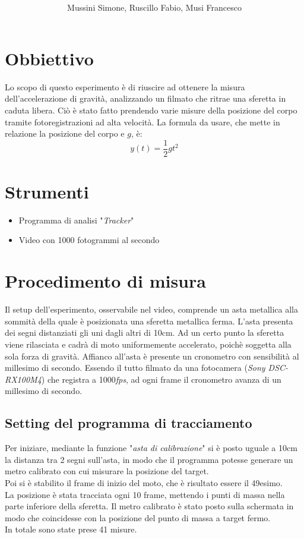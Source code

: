 \documentclass[12pt, a4paper]{article}
\title{\textbf{\scalebox{1.3}{\text{Caduta libera}}}}
\date{}
\author{\begin{small}Mussini Simone, Ruscillo Fabio, Musi Francesco\end{small}}
\begin{document}
\maketitle
\section{Obbiettivo}
\label{sezione obbiettivi}
Lo scopo di questo esperimento è di riuscire ad ottenere la misura dell'accelerazione di gravità, analizzando un filmato che ritrae una sferetta in caduta libera. 
Ciò è stato fatto prendendo varie misure della posizione del corpo tramite fotoregistrazioni ad alta velocità. 
La formula da usare, che mette in relazione la posizione del corpo e $g$, è:
\begin{equation*}
    y(t) = \frac{1}{2}gt^2
\end{equation*}


\section{Strumenti}
\begin{itemize}
\setlength\itemsep{0mm}
    \item Programma di analisi "\textit{Tracker}"
    \item Video con 1000 fotogrammi al secondo
\end{itemize}

\section{Procedimento di misura}
Il setup dell'esperimento, osservabile nel video, comprende un asta metallica alla sommità della quale è posizionata una sferetta metallica ferma. L'asta presenta dei segni distanziati gli uni dagli altri di 10cm. 
Ad un certo punto la sferetta viene rilasciata e cadrà di moto uniformemente accelerato, poichè soggetta alla sola forza di gravità. Affianco all'asta è presente un cronometro con sensibilità al millesimo di secondo. 
Essendo il tutto filmato da una fotocamera (\textit{Sony DSC-RX100M4}) che registra a 1000\textit{fps}, ad ogni frame il cronometro avanza di un millesimo di secondo.

  
\subsection{Setting del programma di tracciamento}
Per iniziare, mediante la funzione "\textit{asta di calibrazione}" si è posto uguale a 10cm la distanza tra 2 segni sull'asta, in modo che il programma potesse generare un metro calibrato con cui misurare la posizione del target. \\
Poi si è stabilito il frame di inizio del moto, che è risultato essere il 49esimo.  \\
La posizione è stata tracciata ogni 10 frame, mettendo i punti di massa nella parte inferiore della sferetta. Il metro calibrato è stato posto sulla schermata in modo che coincidesse con la posizione del punto di massa a target fermo.\\
In totale sono state prese 41 misure.
\end{document}
